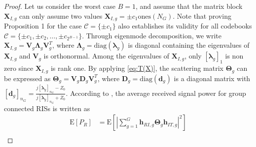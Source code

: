 \documentclass[twocolumn,10pt]{IEEEtran}
\begin{document}
\begin{proof}
Let us consider the worst case $B=1$, and assume that the matrix block $\mathbf{X}_{I,g}$ can only assume two values $\mathbf{X}_{I,g}=\pm c_1\text{ones}\left(N_G\right)$.
Note that proving Proposition 1 for the case $\mathcal{C}=\{\pm c_1\}$ also establishes its validity for all codebooks $\mathcal{C}=\{\pm c_{1},\pm c_{2},\ldots,\pm c_{2^{B-1}}\}$.
Through eigenmode decomposition, we write $\mathbf{X}_{I,g}=\mathbf{V}_{g}\boldsymbol{\Lambda}_{g}\mathbf{V}_{g}^T$, where $\boldsymbol{\Lambda}_{g}=\text{diag}\left(\boldsymbol{\lambda}_g\right)$ is diagonal containing the eigenvalues of $\mathbf{X}_{I,g}$ and $\mathbf{V}_{g}$ is orthonormal.
Among the eigenvalues of $\mathbf{X}_{I,g}$, only $[\boldsymbol{\lambda}_g]_1$ is non zero since $\mathbf{X}_{I,g}$ is rank one.
By applying \eqref{eq:T(X)}, the scattering matrix $\boldsymbol{\Theta}_g$ can be expressed as $\boldsymbol{\Theta}_g=\mathbf{V}_{g}\mathbf{D}_g\mathbf{V}_{g}^T$,
where $\mathbf{D}_g=\text{diag}\left(\mathbf{d}_g\right)$ is a diagonal matrix with $[\mathbf{d}_g]_{n_G}=\frac{j[\boldsymbol{\lambda}_g]_{n_{G}}-Z_{0}}{j[\boldsymbol{\lambda}_g]_{n_G}+Z_{0}}$.
According to \cite{she20}, the average received signal power for group connected RISs is written as
\begin{align}
\text{E}\left[P_{R}\right]
& =\text{E}\left[\left|\sum_{g=1}^{G}\mathbf{h}_{RI,g}\boldsymbol{\Theta}_{g}\mathbf{h}_{IT,g}\right|^2\right]\\

\end{align}
\end{proof}
\end{document}
